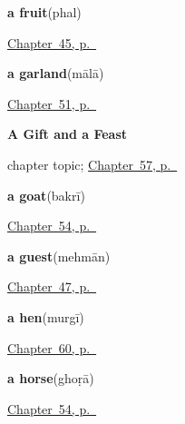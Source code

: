 \noindent\begin{minipage}[t]{\linewidth}
\raggedright
\textbf{a fruit}\enspace\emph{}\enspace(phal)\par
\footnotesize \hyperref[ch:hi-ask-for]{Chapter~45, p.~\pageref*{ch:hi-ask-for}}
\end{minipage}\par\smallskip

\noindent\begin{minipage}[t]{\linewidth}
\raggedright
\textbf{a garland}\enspace\emph{}\enspace(mālā)\par
\footnotesize \hyperref[ch:hi-welcoming-a-guest]{Chapter~51, p.~\pageref*{ch:hi-welcoming-a-guest}}
\end{minipage}\par\smallskip

\noindent\begin{minipage}[t]{\linewidth}
\raggedright
\textbf{A Gift and a Feast}\par
\footnotesize chapter topic; \hyperref[ch:hi-a-gift-and-a-feast]{Chapter~57, p.~\pageref*{ch:hi-a-gift-and-a-feast}}
\end{minipage}\par\smallskip

\noindent\begin{minipage}[t]{\linewidth}
\raggedright
\textbf{a goat}\enspace\emph{}\enspace(bakrī)\par
\footnotesize \hyperref[ch:hi-animals]{Chapter~54, p.~\pageref*{ch:hi-animals}}
\end{minipage}\par\smallskip

\noindent\begin{minipage}[t]{\linewidth}
\raggedright
\textbf{a guest}\enspace\emph{}\enspace(mehmān)\par
\footnotesize \hyperref[ch:hi-roles]{Chapter~47, p.~\pageref*{ch:hi-roles}}
\end{minipage}\par\smallskip

\noindent\begin{minipage}[t]{\linewidth}
\raggedright
\textbf{a hen}\enspace\emph{}\enspace(murgī)\par
\footnotesize \hyperref[ch:hi-animals-in-the-yard]{Chapter~60, p.~\pageref*{ch:hi-animals-in-the-yard}}
\end{minipage}\par\smallskip

\noindent\begin{minipage}[t]{\linewidth}
\raggedright
\textbf{a horse}\enspace\emph{}\enspace(ghoṛā)\par
\footnotesize \hyperref[ch:hi-animals]{Chapter~54, p.~\pageref*{ch:hi-animals}}
\end{minipage}\par\smallskip

